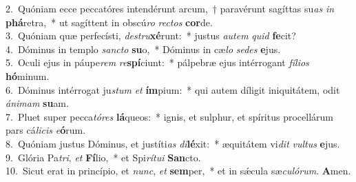 {2.~}Quóniam ecce peccatóres intendérunt arcum,~† paravérunt sagíttas su\textit{as} \textit{in} \textbf{phá}retra,~* ut sagíttent in obscú\textit{ro} \textit{re}\textit{ctos} \textbf{cor}de.\\
{3.~}Quóniam quæ perfecísti, \textit{de}\textit{stru}\textbf{xé}runt:~* justus \textit{au}\textit{tem} \textit{quid} \textbf{fe}cit?\\
{4.~}Dóminus in templo \textit{san}\textit{cto} \textbf{su}o,~* Dóminus in cæ\textit{lo} \textit{se}\textit{des} \textbf{e}jus.\\
{5.~}Oculi ejus in páupe\textit{rem} \textit{re}\textbf{spí}ciunt:~* pálpebræ ejus intérrogant \textit{fí}\textit{li}\textit{os} \textbf{hó}minum.\\
{6.~}Dóminus intérrogat ju\textit{stum} \textit{et} \textbf{ím}pium:~* qui autem díligit iniquitátem, odit \textit{á}\textit{ni}\textit{mam} \textbf{su}am.\\
{7.~}Pluet super pecca\textit{tó}\textit{res} \textbf{lá}queos:~* ignis, et sulphur, et spíritus procellárum pars cá\textit{li}\textit{cis} \textit{e}\textbf{ó}rum.\\
{8.~}Quóniam justus Dóminus, et justíti\textit{as} \textit{di}\textbf{lé}xit:~* æquitátem vi\textit{dit} \textit{vul}\textit{tus} \textbf{e}jus.\\
{9.~}Glória Pa\textit{tri}, \textit{et} \textbf{Fí}lio,~* et Spi\textit{rí}\textit{tu}\textit{i} \textbf{San}cto.\\
{10.~}Sicut erat in princípio, et \textit{nunc}, \textit{et} \textbf{sem}per,~* et in sǽcula sæ\textit{cu}\textit{ló}\textit{rum}. \textbf{A}men.\\
